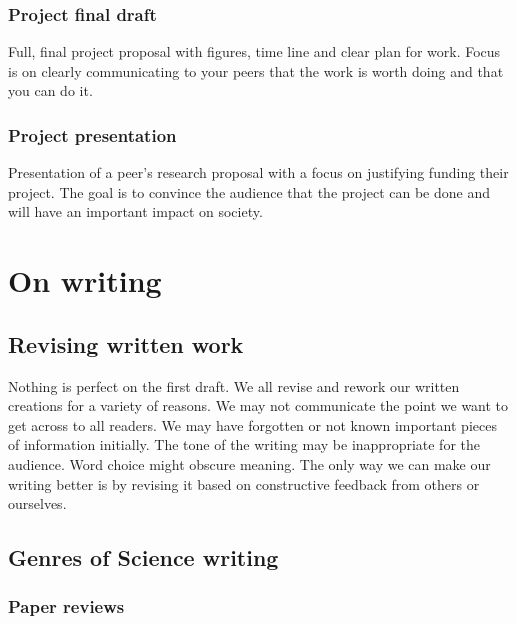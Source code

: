 \documentclass[11pt,]{article}
\begin{document}
\hypertarget{project-final-draft}{%
\subsubsection{Project final draft}\label{project-final-draft}}

Full, final project proposal with figures, time line and clear plan for
work. Focus is on clearly communicating to your peers that the work is
worth doing and that you can do it.

\hypertarget{project-presentation}{%
\subsubsection{Project presentation}\label{project-presentation}}

Presentation of a peer's research proposal with a focus on justifying
funding their project. The goal is to convince the audience that the
project can be done and will have an important impact on society.

\hypertarget{on-writing}{%
\section{On writing}\label{on-writing}}

\hypertarget{revising-written-work}{%
\subsection{Revising written work}\label{revising-written-work}}

Nothing is perfect on the first draft. We all revise and rework our
written creations for a variety of reasons. We may not communicate the
point we want to get across to all readers. We may have forgotten or not
known important pieces of information initially. The tone of the writing
may be inappropriate for the audience. Word choice might obscure
meaning. The only way we can make our writing better is by revising it
based on constructive feedback from others or ourselves.

\hypertarget{genres-of-science-writing}{%
\subsection{Genres of Science writing}\label{genres-of-science-writing}}

\hypertarget{paper-reviews}{%
\subsubsection{Paper reviews}\label{paper-reviews}}
\end{document}

